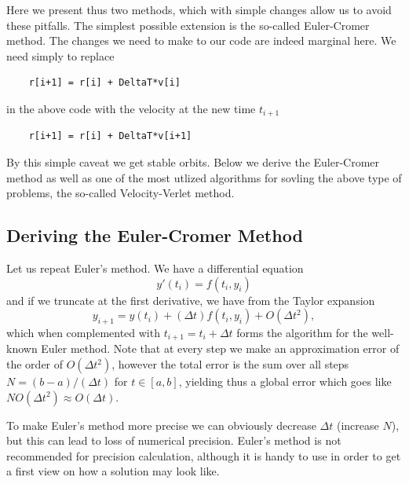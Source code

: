 \documentclass[%
oneside,                 %
final,                   %
10pt]{article}
\begin{document}
Here we present thus two methods, which with simple changes allow us to avoid these pitfalls. The simplest possible extension is the so-called Euler-Cromer method.
The changes we need to make to our code are indeed marginal here.
We need simply to replace


\begin{verbatim}
    r[i+1] = r[i] + DeltaT*v[i]

\end{verbatim}

in the above code with the velocity at the new time $t_{i+1}$


\begin{verbatim}
    r[i+1] = r[i] + DeltaT*v[i+1]

\end{verbatim}


By this simple caveat we get stable orbits.
Below we derive the Euler-Cromer method as well as one of the most utlized algorithms for sovling the above type of problems, the so-called Velocity-Verlet method. 

\subsection*{Deriving the Euler-Cromer Method}

Let us repeat Euler's method.
We have a differential equation
\begin{equation}
y'(t_i)=f(t_i,y_i)   
\end{equation}
and if we truncate at the first derivative, we have from the Taylor expansion
\begin{equation}
y_{i+1}=y(t_i) + (\Delta t) f(t_i,y_i) + O(\Delta t^2), \label{eq:euler}
\end{equation}
which when complemented with $t_{i+1}=t_i+\Delta t$ forms
the algorithm for the well-known Euler method. 
Note that at every step we make an approximation error
of the order of $O(\Delta t^2)$, however the total error is the sum over all
steps $N=(b-a)/(\Delta t)$ for $t\in [a,b]$, yielding thus a global error which goes like
$NO(\Delta t^2)\approx O(\Delta t)$. 

To make Euler's method more precise we can obviously
decrease $\Delta t$ (increase $N$), but this can lead to loss of numerical precision.
Euler's method is not recommended for precision calculation,
although it is handy to use in order to get a first
view on how a solution may look like.
\end{document}
